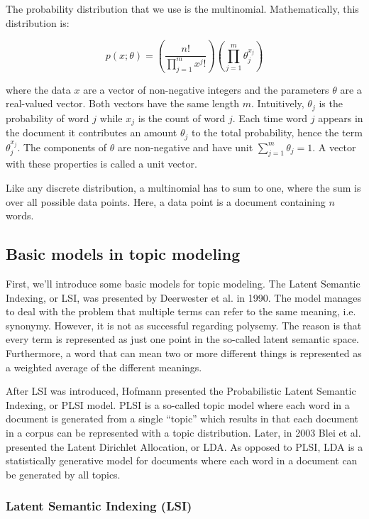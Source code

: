 \documentclass[12pt]{report}
\begin{document}
The probability distribution that we use is the multinomial. Mathematically, 
this distribution is:

\begin{equation}
p(x;\theta) = \left(\frac{n!}{\prod\limits_{j=1}^m x^j!}\right)\left(\prod\limits_{j=1}^m \theta_j^{x_j}\right)
\end{equation}

where the data $x$ are a vector of non-negative integers and the parameters 
$\theta$ are a real-valued vector. Both vectors have the same length $m$. 
Intuitively, $\theta_j$ is the probability of word $j$ while $x_j$ is the count 
of word $j$. Each time word $j$ appears in the document it contributes an amount 
$\theta_j$ to the total probability, hence the term $\theta_j^{x_j}$. 
The components of $\theta$ are non-negative and have unit 
$\sum\limits_{j=1}^m \theta_j = 1$. A vector with these properties is called 
a unit vector.

Like any discrete distribution, a multinomial has to sum to one, where the 
sum is over all possible data points. Here, a data point is a document 
containing $n$ words.


\subsection{Basic models in topic modeling}

First, we’ll introduce some basic models for topic modeling. The Latent Semantic 
Indexing, or LSI, was presented by Deerwester et al. in 1990. The model manages to 
deal with the problem that multiple terms can refer to the same meaning, i.e. 
synonymy. However, it is not as successful regarding polysemy. The reason is that 
every term is represented as just one point in the so-called latent semantic space. 
Furthermore, a word that can mean two or more different things is represented as 
a weighted average of the different meanings.
 
After LSI was introduced, Hofmann presented the Probabilistic Latent Semantic 
Indexing, or PLSI model. PLSI is a so-called topic model where each word in a 
document is generated from a single “topic” which results in that each document 
in a corpus can be represented with a topic distribution. Later, in 2003 Blei et 
al. presented the Latent Dirichlet Allocation, or LDA. As opposed to PLSI, LDA is 
a statistically generative model for documents where each word in a document can 
be generated by all topics.

\subsubsection{Latent Semantic Indexing (LSI)}
\end{document}
